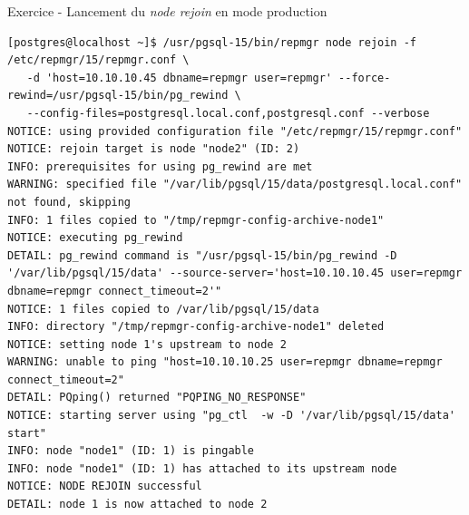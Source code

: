 \begin{frame}[fragile]{Exercice - Lancement du \textit{node rejoin} en mode production}

   \begin{itemize}
\begin{tiny}
\begin{Verbatim}[commandchars=\&\{\}]
[postgres@localhost ~]$ /usr/pgsql-15/bin/repmgr node rejoin -f /etc/repmgr/15/repmgr.conf \
   -d 'host=10.10.10.45 dbname=repmgr user=repmgr' --force-rewind=/usr/pgsql-15/bin/pg_rewind \
   --config-files=postgresql.local.conf,postgresql.conf --verbose                                         
NOTICE: using provided configuration file "/etc/repmgr/15/repmgr.conf"                         
NOTICE: rejoin target is node "node2" (ID: 2)                                                  
INFO: prerequisites for using pg_rewind are met                                                
WARNING: specified file "/var/lib/pgsql/15/data/postgresql.local.conf" not found, skipping
INFO: 1 files copied to "/tmp/repmgr-config-archive-node1"                                     
NOTICE: executing pg_rewind                    
DETAIL: pg_rewind command is "/usr/pgsql-15/bin/pg_rewind -D '/var/lib/pgsql/15/data' --source-server='host=10.10.10.45 user=repmgr dbname=repmgr connect_timeout=2'"
NOTICE: 1 files copied to /var/lib/pgsql/15/data                                               
INFO: directory "/tmp/repmgr-config-archive-node1" deleted                                     
NOTICE: setting node 1's upstream to node 2    
WARNING: unable to ping "host=10.10.10.25 user=repmgr dbname=repmgr connect_timeout=2"         
DETAIL: PQping() returned "PQPING_NO_RESPONSE"                                                 
NOTICE: starting server using "pg_ctl  -w -D '/var/lib/pgsql/15/data' start"                   
INFO: node "node1" (ID: 1) is pingable         
INFO: node "node1" (ID: 1) has attached to its upstream node                                   
NOTICE: NODE REJOIN successful                 
DETAIL: node 1 is now attached to node 2
\end{Verbatim}
\end{tiny}
   \end{itemize}

\end{frame}


